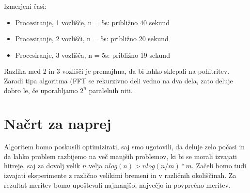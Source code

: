 \documentclass[11pt]{article}
\begin{document}
Izmerjeni časi: 
\begin{itemize}
\item Procesiranje, 1 vozlišče, n = 5s: približno 40 sekund
\item Procesiranje, 2 vozlišči, n = 5s: približno 20 sekund
\item Procesiranje, 3 vozlišča, n = 5s: približno 19 sekund
\end{itemize}
Razlika med 2 in 3 vozlišči je premajhna, da bi lahko sklepali na pohitritev. Zaradi tipa algoritma (FFT se rekurzivno deli vedno na dva dela, zato deluje dobro le, če uporabljamo $2^n$ paralelnih niti.

\section{Načrt za naprej}

Algoritem bomo poskusili optimizirati, saj smo ugotovili, da deluje zelo počasi in da lahko problem razbijemo na več manjših problemov, ki bi se morali izvajati hitreje, saj za dovolj velik $n$ velja $nlog(n) > nlog(n/m)*m$.
Začeli bomo tudi izvajati eksperimente z različno velikimi bremeni in v različnih okoliščinah. Za rezultat meritev bomo upoštevali najmanjšo, največjo in povprečno meritev.




\newpage
\end{document}
